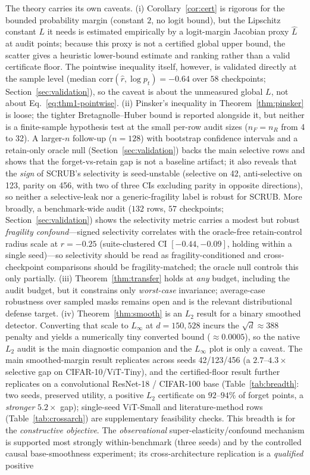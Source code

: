 \documentclass{article}
\begin{document}
The theory carries its own caveats. (i) Corollary~\ref{cor:cert} is rigorous for the bounded probability margin (constant $2$, no logit bound), but the Lipschitz constant $L$ it needs is estimated empirically by a logit-margin Jacobian proxy $\hat L$ at audit points; because this proxy is not a certified global upper bound, the scatter gives a heuristic lower-bound estimate and ranking rather than a valid certificate floor. The pointwise inequality itself, however, is validated directly at the sample level (median $\mathrm{corr}(\hat r,\log p_t)=-0.64$ over $58$ checkpoints; Section~\ref{sec:validation}), so the caveat is about the unmeasured global $L$, not about Eq.~\eqref{eq:thm1-pointwise}. (ii) Pinsker's inequality in Theorem~\ref{thm:pinsker} is loose; the tighter Bretagnolle--Huber bound is reported alongside it, but neither is a finite-sample hypothesis test at the small per-row audit sizes ($n_F = n_R$ from 4 to 32). A larger-$n$ follow-up ($n = 128$) with bootstrap confidence intervals and a retain-only oracle null (Section~\ref{sec:validation}) backs the main selective rows and shows that the forget-vs-retain gap is not a baseline artifact; it also reveals that the \emph{sign} of SCRUB's selectivity is seed-unstable (selective on 42, anti-selective on 123, parity on 456, with two of three CIs excluding parity in opposite directions), so neither a selective-leak nor a generic-fragility label is robust for SCRUB. More broadly, a benchmark-wide audit ($132$ rows, $57$ checkpoints; Section~\ref{sec:validation}) shows the selectivity metric carries a modest but robust \emph{fragility confound}---signed selectivity correlates with the oracle-free retain-control radius scale at $r=-0.25$ (suite-clustered CI $[-0.44,-0.09]$, holding within a single seed)---so selectivity should be read as fragility-conditioned and cross-checkpoint comparisons should be fragility-matched; the oracle null controls this only partially. (iii) Theorem~\ref{thm:transfer} holds at \emph{any} budget, including the audit budget, but it constrains only \emph{worst-case} invariance; average-case robustness over sampled masks remains open and is the relevant distributional defense target. (iv) Theorem~\ref{thm:smooth} is an $L_2$ result for a binary smoothed detector. Converting that scale to $L_\infty$ at $d = 150{,}528$ incurs the $\sqrt{d}\approx388$ penalty and yields a numerically tiny converted bound ($\approx 0.0005$), so the native $L_2$ audit is the main diagnostic companion and the $L_\infty$ plot is only a caveat. The main smoothed-margin result replicates across seeds 42/123/456 (a $2.7$--$4.3\times$ selective gap on CIFAR-10/ViT-Tiny), and the certified-floor result further replicates on a convolutional ResNet-18 / CIFAR-100 base (Table~\ref{tab:breadth}: two seeds, preserved utility, a positive $L_2$ certificate on $92$--$94\%$ of forget points, a \emph{stronger} $5.2\times$ gap); single-seed ViT-Small and literature-method rows (Table~\ref{tab:crossarch}) are supplementary feasibility checks. This breadth is for the \emph{constructive objective}. The \emph{observational} super-elasticity/confound mechanism is supported most strongly within-benchmark (three seeds) and by the controlled causal base-smoothness experiment; its cross-architecture replication is a \emph{qualified} positive 
\end{document}
